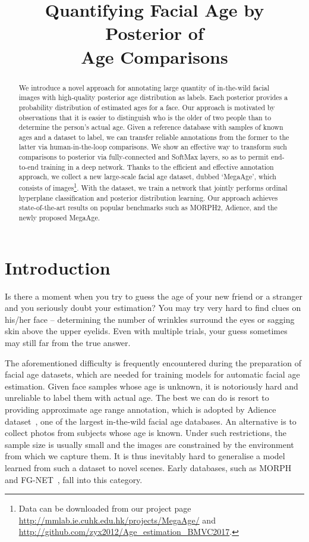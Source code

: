 \documentclass{bmvc2k}
\title{Quantifying Facial Age by Posterior of \\ Age Comparisons}
\begin{document}
\maketitle

\begin{abstract}
We introduce a novel approach for annotating large quantity of in-the-wild facial images with high-quality posterior age distribution as labels. Each posterior provides a probability distribution of estimated ages for a face. Our approach is motivated by observations that it is easier to distinguish who is the older of two people than to determine the person's actual age. Given a reference database with samples of known ages and a dataset to label, we can transfer reliable annotations from the former to the latter via human-in-the-loop comparisons. We show an effective way to transform such comparisons to posterior via fully-connected and SoftMax layers, so as to permit end-to-end training in a deep network.
Thanks to the efficient and effective annotation approach, we collect a new large-scale facial age dataset, dubbed `MegaAge', which consists of  images\footnote{Data can be downloaded from our project page \url{http://mmlab.ie.cuhk.edu.hk/projects/MegaAge/} and \url{http://github.com/zyx2012/Age_estimation_BMVC2017}.}. With the dataset, we train a network that jointly performs ordinal hyperplane classification and posterior distribution learning. Our approach achieves state-of-the-art results on popular benchmarks such as MORPH2, Adience, and the newly proposed MegaAge. 

\noindent
\color{red}{Note: There are mistakes in our original paper. Please check the appendix for errata.}
\end{abstract}

\section{Introduction}
\label{sec:intro}

Is there a moment when you try to guess the age of your new friend or a stranger and you seriously doubt your estimation? You may try very hard to find clues on his/her face -- determining the number of wrinkles surround the eyes or sagging skin above the upper eyelids. Even with multiple trials, your guess sometimes may still far from the true answer.


The aforementioned difficulty is frequently encountered during the preparation of facial age datasets, which are needed for training models for automatic facial age estimation. Given face samples whose age is unknown, it is notoriously hard and unreliable to label them with actual age. The best we can do is resort to providing approximate age range annotation, which is adopted by Adience dataset~\cite{eidinger2014age}, one of the largest in-the-wild facial age databases. 
An alternative is to collect photos from subjects whose age is known. Under such restrictions, the sample size is usually small and the images are constrained by the environment from which we capture them. It is thus inevitably hard to generalise a model learned from such a dataset to novel scenes. Early databases, such as MORPH~\cite{ricanek2006morph} and FG-NET~\cite{panis2014overview}, fall into this category. 
\end{document}
